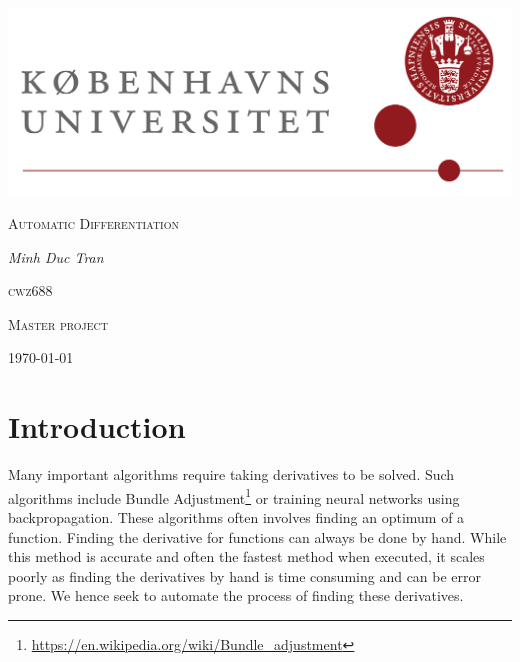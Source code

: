 
\usepackage{amsthm}
\usepackage{xcolor}


\theoremstyle{definition}
\newtheorem{definition}{Definition}[section]
\newtheorem{problem}{Problem}[section]
\newtheorem{theorem}{Theorem}[section]
\newtheorem{corollary}{Corollary}[theorem]
\newtheorem{lemma}[theorem]{Lemma}
\usepackage{hyperref}

\author{Minh}

	\begin{titlepage}
		\centering
		\includegraphics[width=\textwidth]{KuLogo.png}
		\par\vspace{1cm}
		\vspace{1cm}

		{\scshape\Large Automatic Differentiation \\
			\par}

		\vspace{1.5cm}
		{\Large\itshape  Minh Duc Tran }\\
		\vspace{0.5cm}
		{\scshape\large cwz688 \\ \par}
		\vfill

		{\Large\scshape Master project \par}

		\vfill
		\par
		\vfill
		{\large \today\par}
	\end{titlepage}
	\newpage
	\tableofcontents
	\newpage
	\section{Introduction}
	Many important algorithms require taking derivatives to be solved. Such algorithms
	include Bundle Adjustment\footnote{\url{https://en.wikipedia.org/wiki/Bundle_adjustment}} or training neural networks using backpropagation. 
	These algorithms often involves finding an optimum of a function. 
	Finding the derivative for functions can always be done by hand. 
	While this method is accurate and often the fastest method when executed, 
    it scales poorly as finding the derivatives by hand is time consuming and can be error prone.  We
	hence seek to automate the process of finding these derivatives. \newline

